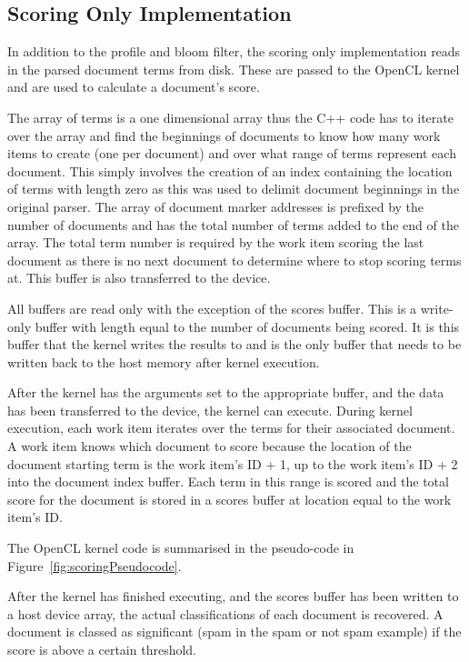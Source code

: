 \subsection{Scoring Only Implementation}

In addition to the profile and bloom filter, the scoring only implementation
reads in the parsed document terms from disk. These are passed to the OpenCL
kernel and are used to calculate a document's score.

The array of terms is a one dimensional array thus the C++ code has to iterate
over the array and find the beginnings of documents to know how many work items
to create (one per document) and over what range of terms represent each
document. This simply involves the creation of an index containing the location
of terms with length zero as this was used to delimit document beginnings in the
original parser. The array of document marker addresses is prefixed by the
number of documents and has the total number of terms added to the end of the
array. The total term number is required by the work item scoring the last
document as there is no next document to determine where to stop scoring terms
at. This buffer is also transferred to the device.

All buffers are read only with the exception of the scores buffer. This is a
write-only buffer with length equal to the number of documents being scored. It
is this buffer that the kernel writes the results to and is the only buffer that
needs to be written back to the host memory after kernel execution.

After the kernel has the arguments set to the appropriate buffer, and the data
has been transferred to the device, the kernel can execute. During kernel
execution, each work item iterates over the terms for their associated document.
A work item knows which document to score because the location of the document
starting term is the work item's ID + 1, up to the work item's ID + 2 into the
document index buffer. Each term in this range is scored and the total score for
the document is stored in a scores buffer at location equal to the work item's
ID.

The OpenCL kernel code is summarised in the pseudo-code in
Figure~\ref{fig:scoringPseudocode}.

After the kernel has finished executing, and the scores buffer has been written
to a host device array, the actual classifications of each document is
recovered. A document is classed as significant (spam in the spam or not spam
example) if the score is above a certain threshold.

